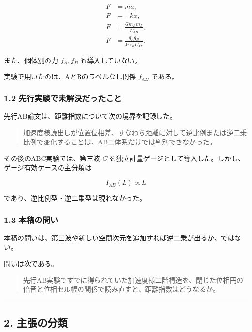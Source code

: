 \documentclass[
  10pt,
  a4paper,
]{ltjsarticle}
\begin{document}
\[
\begin{aligned}
F&=ma,\\
F&=-kx,\\
F&=\frac{Gm_A m_B}{L_{AB}^2},\\
F&=\frac{q_Aq_B}{4\pi\varepsilon_0L_{AB}^2}.
\end{aligned}
\]

また、個体別の力 \(f_A,f_B\) も導入していない。

実験で用いたのは、AとBのラベルなし関係 \(f_{AB}\) である。

\subsubsection{1.2
先行実験で未解決だったこと}\label{ux5148ux884cux5b9fux9a13ux3067ux672aux89e3ux6c7aux3060ux3063ux305fux3053ux3068}

先行AB論文は、距離指数について次の境界を記録した。

\begin{quote}
加速度様読出しが位置位相差、すなわち距離に対して逆比例または逆二乗比例で変化することは、AB二体系だけでは判別できなかった。
\end{quote}

その後のABC実験では、第三波 \(C\)
を独立計量ゲージとして導入した。しかし、ゲージ有効ケースの主分類は

\[
I_{AB}(L)\propto L
\]

であり、逆比例型・逆二乗型は現れなかった。

\subsubsection{1.3 本稿の問い}\label{ux672cux7a3fux306eux554fux3044}

本稿の問いは、第三波や新しい空間次元を追加すれば逆二乗が出るか、ではない。

問いは次である。

\begin{quote}
先行AB実験ですでに得られていた加速度様二階構造を、閉じた位相円の倍音と位相セル幅の関係で読み直すと、距離指数はどうなるか。
\end{quote}

\begin{center}\rule{0.5\linewidth}{0.5pt}\end{center}

\subsection{2. 主張の分類}\label{ux4e3bux5f35ux306eux5206ux985e}
\end{document}
